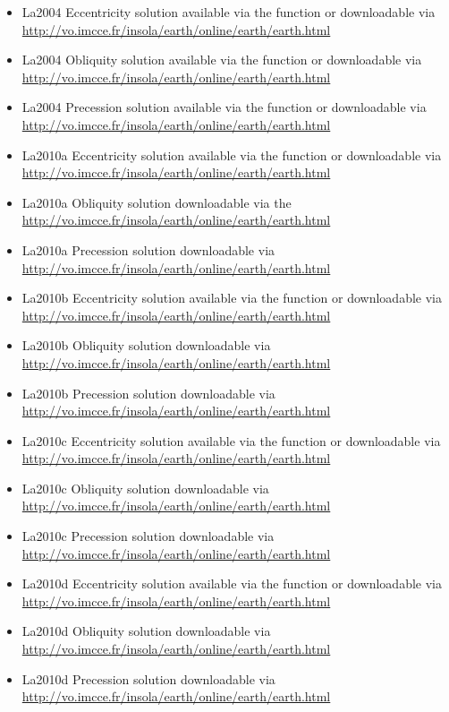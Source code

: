 \documentclass[a4paper]{book}
\begin{document}
\begin{Description}
\begin{itemize}
\item{} La2004 Eccentricity solution available via the  function or downloadable via \url{http://vo.imcce.fr/insola/earth/online/earth/earth.html}
\item{} La2004 Obliquity solution available via the  function or downloadable via \url{http://vo.imcce.fr/insola/earth/online/earth/earth.html}
\item{} La2004 Precession solution available via the  function or downloadable via \url{http://vo.imcce.fr/insola/earth/online/earth/earth.html}
\item{} La2010a Eccentricity solution available via the function or downloadable via \url{http://vo.imcce.fr/insola/earth/online/earth/earth.html}
\item{} La2010a Obliquity solution downloadable via the \url{http://vo.imcce.fr/insola/earth/online/earth/earth.html}
\item{} La2010a Precession solution downloadable via \url{http://vo.imcce.fr/insola/earth/online/earth/earth.html}
\item{} La2010b Eccentricity solution available via the  function or downloadable via \url{http://vo.imcce.fr/insola/earth/online/earth/earth.html}
\item{} La2010b Obliquity solution downloadable via \url{http://vo.imcce.fr/insola/earth/online/earth/earth.html}
\item{} La2010b Precession solution downloadable via \url{http://vo.imcce.fr/insola/earth/online/earth/earth.html}
\item{} La2010c Eccentricity solution available via the  function or downloadable via \url{http://vo.imcce.fr/insola/earth/online/earth/earth.html}
\item{} La2010c Obliquity solution downloadable via \url{http://vo.imcce.fr/insola/earth/online/earth/earth.html}
\item{} La2010c Precession solution downloadable via \url{http://vo.imcce.fr/insola/earth/online/earth/earth.html}
\item{} La2010d Eccentricity solution available via the  function or downloadable via \url{http://vo.imcce.fr/insola/earth/online/earth/earth.html}
\item{} La2010d Obliquity solution downloadable via \url{http://vo.imcce.fr/insola/earth/online/earth/earth.html}
\item{} La2010d Precession solution downloadable via \url{http://vo.imcce.fr/insola/earth/online/earth/earth.html}

\end{itemize}
\end{Description}
\end{document}
